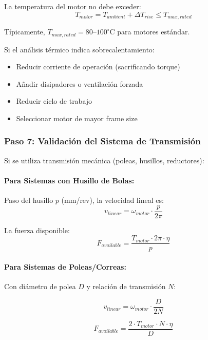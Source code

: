 La temperatura del motor no debe exceder:
\begin{equation}
T_{motor} = T_{ambient} + \Delta T_{rise} \leq T_{max,rated}
\end{equation}

Típicamente, $T_{max,rated} = 80$--$100^\circ$C para motores estándar.

Si el análisis térmico indica sobrecalentamiento:
\begin{itemize}
    \item Reducir corriente de operación (sacrificando torque)
    \item Añadir disipadores o ventilación forzada
    \item Reducir ciclo de trabajo
    \item Seleccionar motor de mayor frame size
\end{itemize}

\subsubsection{Paso 7: Validación del Sistema de Transmisión}

Si se utiliza transmisión mecánica (poleas, husillos, reductores):

\paragraph{Para Sistemas con Husillo de Bolas:}

Paso del husillo $p$ (mm/rev), la velocidad lineal es:
\begin{equation}
v_{linear} = \omega_{motor} \cdot \frac{p}{2\pi}
\end{equation}

La fuerza disponible:
\begin{equation}
F_{available} = \frac{T_{motor} \cdot 2\pi \cdot \eta}{p}
\end{equation}

\paragraph{Para Sistemas de Poleas/Correas:}

Con diámetro de polea $D$ y relación de transmisión $N$:

\begin{equation}
v_{linear} = \omega_{motor} \cdot \frac{D}{2N}
\end{equation}

\begin{equation}
F_{available} = \frac{2 \cdot T_{motor} \cdot N \cdot \eta}{D}
\end{equation}


